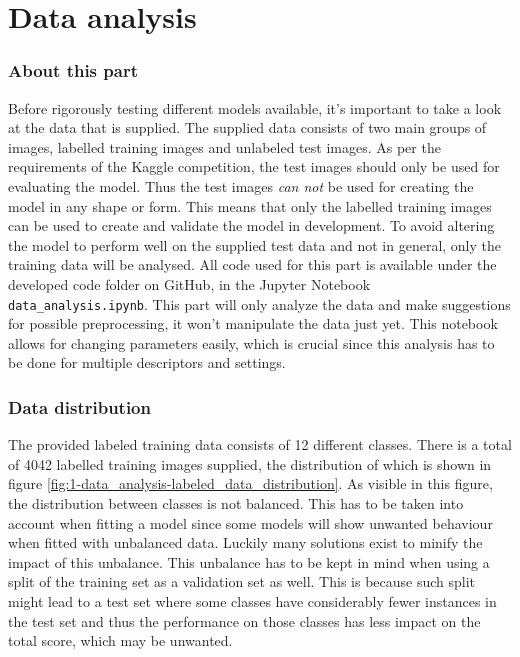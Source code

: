 \part{Data analysis}
\label{part:data_analysis}


\section{About this part}
\label{section:DA_about_part}
Before rigorously testing different models available, it's important to take a look at the data that is supplied.
The supplied data consists of two main groups of images, labelled training images and unlabeled test images.
As per the requirements of the Kaggle competition, the test images should only be used for evaluating the model.
Thus the test images \textit{can not} be used for creating the model in any shape or form.
This means that only the labelled training images can be used to create and validate the model in development.
To avoid altering the model to perform well on the supplied test data and not in general, only the training data will be analysed.
All code used for this part is available under the developed code folder on GitHub, in the Jupyter Notebook \texttt{data\_analysis.ipynb}.
This part will only analyze the data and make suggestions for possible preprocessing, it won't manipulate the data just yet.
This notebook allows for changing parameters easily, which is crucial since this analysis has to be done for multiple descriptors and settings.


\section{Data distribution}
\label{section:DA_data_distribution}
The provided labeled training data consists of 12 different classes.
There is a total of 4042 labelled training images supplied, the distribution of which is shown in figure \ref{fig:1-data_analysis-labeled_data_distribution}.
As visible in this figure, the distribution between classes is not balanced.
This has to be taken into account when fitting a model since some models will show unwanted behaviour when fitted with unbalanced data.
Luckily many solutions exist to minify the impact of this unbalance.
This unbalance has to be kept in mind when using a split of the training set as a validation set as well.
This is because such split might lead to a test set where some classes have considerably fewer instances in the test set and thus the performance on those classes has less impact on the total score, which may be unwanted.


